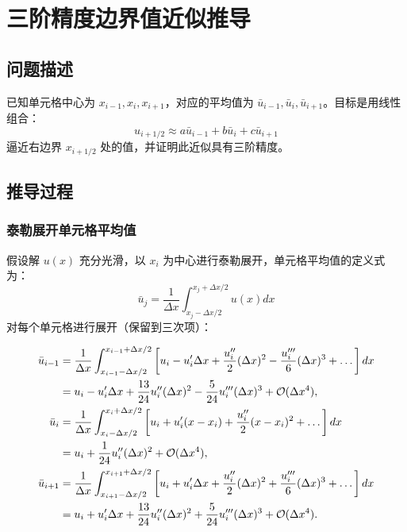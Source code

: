 \documentclass{ctexart}
\begin{document}
\section{三阶精度边界值近似推导}

\subsection{问题描述}
已知单元格中心为 \(x_{i-1}, x_i, x_{i+1}\)，对应的平均值为 \(\bar{u}_{i-1}, \bar{u}_i, \bar{u}_{i+1}\)。目标是用线性组合：
\[
u_{i+1/2} \approx a \bar{u}_{i-1} + b \bar{u}_i + c \bar{u}_{i+1}
\]
逼近右边界 \(x_{i+1/2}\) 处的值，并证明此近似具有三阶精度。

\subsection{推导过程}

\subsubsection{泰勒展开单元格平均值}
假设解 \(u(x)\) 充分光滑，以 \(x_i\) 为中心进行泰勒展开，单元格平均值的定义式为：
\[
\bar{u}_j = \frac{1}{\Delta x} \int_{x_j - \Delta x/2}^{x_j + \Delta x/2} u(x) dx
\]
对每个单元格进行展开（保留到三次项）：

\begin{align}
\bar{u}_{i-1} &= \frac{1}{\Delta x} \int_{x_{i-1} - \Delta x/2}^{x_{i-1} + \Delta x/2} \left[ u_i - u'_i \Delta x + \frac{u''_i}{2} (\Delta x)^2 - \frac{u'''_i}{6} (\Delta x)^3 + \dots \right] dx \notag \\
&= u_i - u'_i \Delta x + \frac{13}{24} u''_i (\Delta x)^2 - \frac{5}{24} u'''_i (\Delta x)^3 + \mathcal{O}(\Delta x^4), \\
\bar{u}_i &= \frac{1}{\Delta x} \int_{x_i - \Delta x/2}^{x_i + \Delta x/2} \left[ u_i + u'_i (x - x_i) + \frac{u''_i}{2} (x - x_i)^2 + \dots \right] dx \notag \\
&= u_i + \frac{1}{24} u''_i (\Delta x)^2 + \mathcal{O}(\Delta x^4), \\
\bar{u}_{i+1} &= \frac{1}{\Delta x} \int_{x_{i+1} - \Delta x/2}^{x_{i+1} + \Delta x/2} \left[ u_i + u'_i \Delta x + \frac{u''_i}{2} (\Delta x)^2 + \frac{u'''_i}{6} (\Delta x)^3 + \dots \right] dx \notag \\
&= u_i + u'_i \Delta x + \frac{13}{24} u''_i (\Delta x)^2 + \frac{5}{24} u'''_i (\Delta x)^3 + \mathcal{O}(\Delta x^4).
\end{align}
\end{document}
